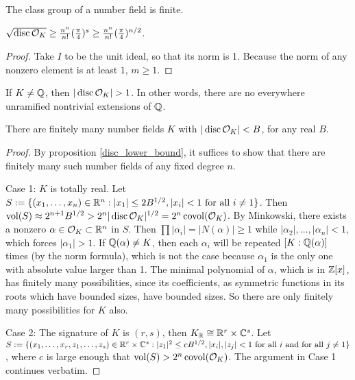 \documentclass[11pt]{amsart}
\begin{document}
\begin{thm}
The class group of a number field is finite.
\end{thm}

\begin{prop}
\label{disc_lower_bound}
$\sqrt{\operatorname{disc} \mathcal{O}_K} \ge \frac{n^n}{n!} (\frac{\pi}{4})^{s} \ge \frac{n^n}{n!} (\frac{\pi}{4})^{n/2}$.
\end{prop}

\begin{proof}
Take $I$ to be the unit ideal, so that its norm is 1. Because the norm of any nonzero element is at least $1$, $m\ge 1$.
\end{proof}

\begin{cor}
If $K\neq \mathbb{Q}$, then $|\disc \cO_K|>1$. In other words, there are no everywhere unramified nontrivial extensions of $\mathbb{Q}$.
\end{cor}


\begin{prop}
There are finitely many number fields $K$ with $|\operatorname{disc} \mathcal{O}_K| < B$, for any real $B$.
\end{prop}

\begin{proof}

By proposition \ref{disc_lower_bound}, it suffices to show that there are finitely many such number fields of any fixed degree $n$. 


Case 1: $K$ is totally real. Let $S := \{(x_1,\dots,x_n)\in \mathbb{R}^n: |x_1| \le 2B^{1/2}, |x_i| < 1 \text{ for all } i\neq 1\}$. Then $\operatorname{vol}(S) \approx 2^{n+1}B^{1/2} > 2^n |\operatorname{disc} \mathcal{O}_K|^{1/2} = 2^n\operatorname{covol}(\mathcal{O}_K)$. By Minkowski, there exists a nonzero $\alpha\in \mathcal{O}_K \subset \mathbb{R}^n$ in $S$. Then $\prod |\alpha_i| = |N(\alpha)| \ge 1$ while $|\alpha_2|,\dots,|\alpha_n| < 1$, which forces $|\alpha_1| > 1$. If $\mathbb{Q}(\alpha)\neq K$, then each $\alpha_i$ will be repeated $[K:\mathbb{Q}(\alpha)]$ times (by the norm formula), which is not the case because $\alpha_1$ is the only one with absolute value larger than 1. The minimal polynomial of $\alpha$, which is in $\mathbb{Z}[x]$, has finitely many possibilities, since its coefficients, as symmetric functions in its roots which have bounded sizes, have bounded sizes. So there are only finitely many possibilities for $K$ also.

Case 2: The signature of $K$ is $(r,s)$, then $K_{\mathbb{R}}\cong \mathbb{R}^r \times \mathbb{C}^s$. Let $S := \{(x_1,\dots,x_r, z_1,\dots,z_s)\in \mathbb{R}^r\times \mathbb{C}^s: |z_1|^2 \le cB^{1/2}, |x_i|, |z_j| < 1 \text{ for all } i \text{ and for all } j\neq 1\}$, where $c$ is large enough that $\operatorname{vol}(S) > 2^n\operatorname{covol}(\mathcal{O}_K)$. The argument in Case 1 continues verbatim.
\end{proof}
\end{document}
